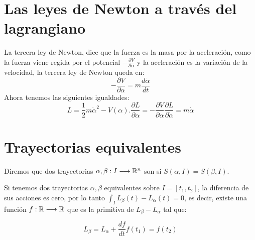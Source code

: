 \section{Las leyes de Newton a través del lagrangiano}
La tercera ley de Newton, dice que la fuerza es la masa por la aceleración, como la fuerza viene regida por el potencial $-\frac{\partial V}{\partial\alpha}$ y la aceleración es la variación de la velocidad, la tercera ley de Newton queda en:
\begin{equation*}
    -\frac{\partial V}{\partial\alpha} = m\frac{d\dot{\alpha}}{dt}
\end{equation*}
Ahora tenemos las siguientes igualdades:
\begin{subequations}
    \begin{equation*}
        L=\frac{1}{2}m\dot{\alpha}^2-V(\alpha).
    \end{equation*}
    \begin{equation*}
        \frac{\partial L}{\partial \alpha}=-\frac{\partial V}{\partial \alpha}
    \end{equation*}
    \begin{equation*}
        \frac{\partial L}{\partial\dot{\alpha}}=m\dot{\alpha}
    \end{equation*}
\end{subequations}


\section{Trayectorias equivalentes}
\begin{definition}
    Diremos que dos trayectorias $\alpha,\beta:I\longrightarrow \mathbb{R}^n$ son  si $S(\alpha, I)=S(\beta, I)$.
\end{definition}

Si tenemos dos trayectorias $\alpha, \beta$ equivalentes sobre $I=[t_1, t_2]$, la diferencia de sus acciones es cero, por lo tanto $\int_{I} L_\beta(t)-L_\alpha(t)=0$, es decir, existe una función $f:\mathbb{R}\longrightarrow \mathbb{R}$ que es la primitiva de $L_\beta-L_\alpha$ tal que:
\begin{postulate}
    \begin{subequations}
        \begin{equation}
            \label{eq:lagrangiano_trayectorias_equivalentes_1}
            L_\beta=L_\alpha+\frac{df}{dt}
        \end{equation}
        \begin{equation}
            \label{eq:lagrangiano_trayectorias_equivalentes_2}
            f(t_1)=f(t_2)
        \end{equation}
    \end{subequations}
\end{postulate}

